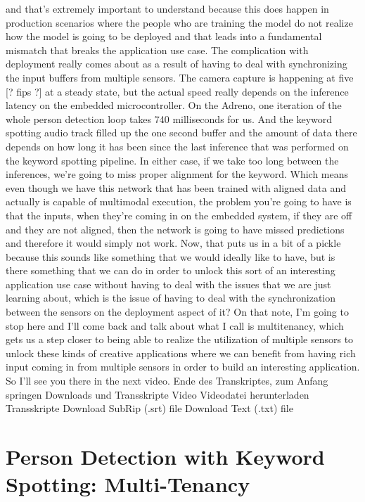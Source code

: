     and that's extremely important to understand because this does happen
    in production scenarios where the people who are training the model
    do not realize how the model is going to be deployed
    and that leads into a fundamental mismatch that breaks the application
    use case.
    The complication with deployment really comes
    about as a result of having to deal with synchronizing the input
    buffers from multiple sensors.
    The camera capture is happening at five [? fips ?] at a steady state,
    but the actual speed really depends on the inference latency
    on the embedded microcontroller.
    On the Adreno, one iteration of the whole person detection loop
    takes 740 milliseconds for us.
    And the keyword spotting audio track filled up the one second buffer
    and the amount of data there depends on how long
    it has been since the last inference that was performed
    on the keyword spotting pipeline.
    In either case, if we take too long between the inferences,
    we're going to miss proper alignment for the keyword.
    Which means even though we have this network that
    has been trained with aligned data and actually
    is capable of multimodal execution, the problem you're going to have
    is that the inputs, when they're coming in on the embedded system,
    if they are off and they are not aligned,
    then the network is going to have missed predictions
    and therefore it would simply not work.
    Now, that puts us in a bit of a pickle because this sounds like something
    that we would ideally like to have, but is there
    something that we can do in order to unlock
    this sort of an interesting application use case
    without having to deal with the issues that we are just learning about,
    which is the issue of having to deal with the synchronization
    between the sensors on the deployment aspect of it?
    On that note, I'm going to stop here and I'll
    come back and talk about what I call is multitenancy, which
    gets us a step closer to being able to realize
    the utilization of multiple sensors to unlock
    these kinds of creative applications where
    we can benefit from having rich input coming
    in from multiple sensors in order to build an interesting application.
    So I'll see you there in the next video.
    Ende des Transkriptes, zum Anfang springen
    Downloads und Transskripte
    Video
    Videodatei herunterladen
    Transskripte
    Download SubRip (.srt) file
    Download Text (.txt) file    
    
\section{Person Detection with Keyword Spotting: Multi-Tenancy}

